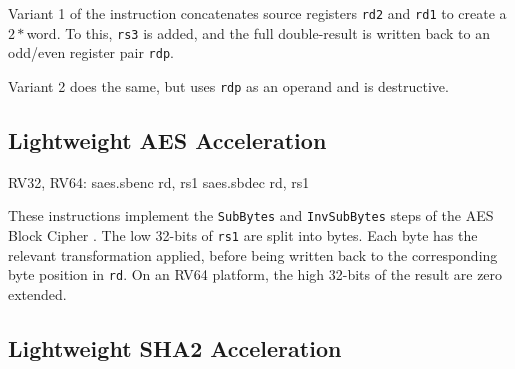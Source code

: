 Variant 1 of the  instruction
concatenates source registers
{\tt rd2}
and
{\tt rd1}
to create a $2*$\XLEN word.
To this,
{\tt rs3} is added,
and the full double-\XLEN result is written back to
an odd/even register pair {\tt rdp}.

Variant 2 does the same, but uses {\tt rdp} as an operand and is
destructive.



\subsection{Lightweight AES Acceleration}

\begin{cryptoisa}
RV32, RV64:
    saes.sbenc rd, rs1
    saes.sbdec rd, rs1
\end{cryptoisa}

These instructions implement the 
{\tt SubBytes} \cite[Section 5.1.1]{nist:fips:197}
and
{\tt InvSubBytes} \cite[Section 5.3.1]{nist:fips:197}
steps of the AES Block Cipher \cite{nist:fips:197}.
The low 32-bits of {\tt rs1} are split into bytes.
Each byte has the relevant transformation applied, before
being written back to the corresponding byte position in {\tt rd}.
On an RV64 platform, the high 32-bits of the result are zero
extended.





\subsection{Lightweight SHA2 Acceleration}

